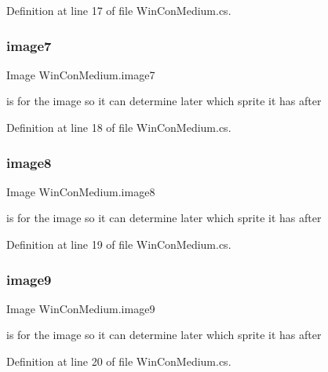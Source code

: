 Definition at line 17 of file Win\+Con\+Medium.\+cs.

\mbox{\label{class_win_con_medium_a553c100528be51cc214553460c9c8582}} 
\subsubsection{\texorpdfstring{image7}{image7}}
{\footnotesize\ttfamily Image Win\+Con\+Medium.\+image7}

is for the image so it can determine later which sprite it has after 

Definition at line 18 of file Win\+Con\+Medium.\+cs.

\mbox{\label{class_win_con_medium_abcb0b4094b6fc577143db613bef96763}} 
\subsubsection{\texorpdfstring{image8}{image8}}
{\footnotesize\ttfamily Image Win\+Con\+Medium.\+image8}

is for the image so it can determine later which sprite it has after 

Definition at line 19 of file Win\+Con\+Medium.\+cs.

\mbox{\label{class_win_con_medium_aef132b2d30a26c75dd9203bf8a94dd4d}} 
\subsubsection{\texorpdfstring{image9}{image9}}
{\footnotesize\ttfamily Image Win\+Con\+Medium.\+image9}

is for the image so it can determine later which sprite it has after 

Definition at line 20 of file Win\+Con\+Medium.\+cs.

\mbox{\label{class_win_con_medium_a693c73d3a2ba5333e30b33bc43f1842e}} 
